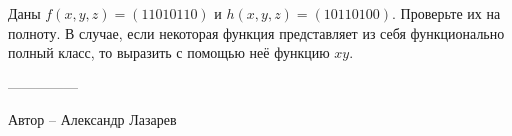 \question
Даны $f(x, y, z) = (11010110)$ и $h(x, y, z) = (10110100)$. Проверьте их на полноту. В случае, если некоторая функция представляет из себя функционально полный класс, то выразить с помощью неё функцию  $xy$.

---------------

Автор -- Александр Лазарев